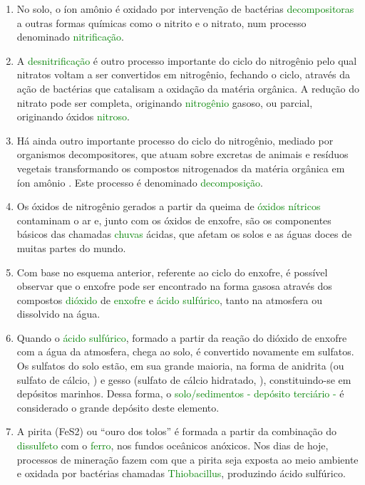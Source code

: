 \documentclass[a4paper,12pt]{article}
\begin{document}
\begin{enumerate}
\item No solo, o íon amônio é oxidado por intervenção de bactérias \textcolor{green}{decompositoras} a outras formas químicas como o nitrito e o nitrato, num processo denominado \textcolor{green}{nitrificação}.
\item A \textcolor{green}{desnitrificação} é outro processo importante do ciclo do nitrogênio pelo qual nitratos voltam a ser convertidos em nitrogênio, fechando o ciclo, através da ação de bactérias que catalisam a oxidação da matéria orgânica. A redução do nitrato pode ser completa, originando \textcolor{green}{nitrogênio} gasoso, ou parcial, originando óxidos \textcolor{green}{nitroso}.
\item Há ainda outro importante processo do ciclo do nitrogênio, mediado por organismos decompositores, que atuam sobre excretas de animais e resíduos vegetais transformando os compostos nitrogenados da matéria orgânica em íon amônio . Este processo é denominado \textcolor{green}{decomposição}.
\item Os óxidos de nitrogênio gerados a partir da queima de \textcolor{green}{óxidos} \textcolor{green}{nítricos} contaminam o ar e, junto com os óxidos de enxofre, são os componentes básicos das chamadas \textcolor{green}{chuvas} ácidas, que afetam os solos e as águas doces de muitas partes do mundo.
\item Com base no esquema anterior, referente ao ciclo do enxofre, é possível observar que o enxofre pode ser encontrado na forma gasosa através dos compostos \textcolor{green}{dióxido} de \textcolor{green}{enxofre} e \textcolor{green}{ácido} \textcolor{green}{sulfúrico}, tanto na atmosfera ou dissolvido na água.
\item Quando o \textcolor{green}{ácido} \textcolor{green}{sulfúrico}, formado a partir da reação do dióxido de enxofre com a água da atmosfera, chega ao solo, é convertido novamente em sulfatos. Os sulfatos do solo estão, em sua grande maioria, na forma de anidrita (ou sulfato de cálcio, ) e gesso (sulfato de cálcio hidratado, ), constituindo-se em depósitos marinhos. Dessa forma, o \textcolor{green}{solo/sedimentos - depósito terciário -} é considerado o grande depósito deste elemento.
\item A pirita (FeS2) ou “ouro dos tolos” é formada a partir da combinação do \textcolor{green}{dissulfeto} com o \textcolor{green}{ferro}, nos fundos oceânicos anóxicos. Nos dias de hoje, processos de mineração fazem com que a pirita seja exposta ao meio ambiente e oxidada por bactérias chamadas \textcolor{green}{Thiobacillus}, produzindo ácido sulfúrico.

\end{enumerate}
\end{document}
